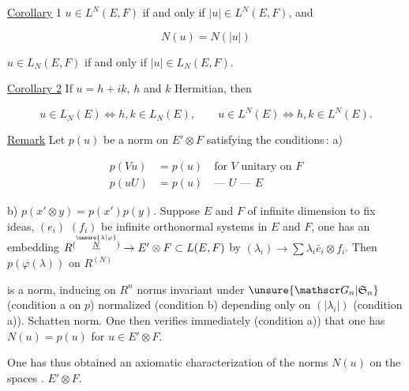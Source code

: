 
\uline{Corollary} 1 $u\in L^N(E,F)$ if and only if $|u|\in L^N(E,F)$, and

\[
N(u)=N(|u|)
\]

$u\in L_N(E,F)$ if and only if $|u|\in L_N(E,F)$.


\uline{Corollary 2} If $u=h+ik$, $h$ and $k$ Hermitian, then

\[
u\in L_N(E)\Longleftrightarrow h,k\in L_N(E),\qquad
u\in L^N(E)\Longleftrightarrow h,k\in L^N(E).
\]

\uline{Remark} Let $p(u)$ be a norm on $E'\otimes F$ satisfying the conditions\,: a)

\[
\begin{aligned}
p(Vu)&=p(u)\quad\text{for $V$ unitary on $F$}\\
p(uU)&=p(u)\quad\text{--- $U$ --- $E$}
\end{aligned}
\]

b) $p(x'\otimes y)=p(x')p(y)$. Suppose $E$ and $F$ of infinite dimension to fix ideas,  $(e_i)$ $(f_i)$ be infinite orthonormal systems in $E$ and $F$, one has an embedding $R^{(\overset{\unsure{\lambda|\varphi}}{\underline N})}\to E'\otimes F\subset L(E,F)$ by $(\lambda_i)\to\sum\lambda_i\bar e_i\otimes f_i$. Then $p(\varphi(\lambda))$ on $R^{(N)}$

is a norm, inducing on $R^n$ norms  invariant under $\unsure{\mathscr G_n|\mathfrak S_n}$ (condition a on $p$) normalized (condition b) depending only on $(|\lambda_i|)$ (condition a)).   Schatten norm. One then verifies immediately (condition a)) that one has $N(u)=p(u)$ for  $u\in E'\otimes F$.

One has thus obtained an axiomatic characterization of the norms $N(u)$ on the spaces . $E'\otimes F$.

